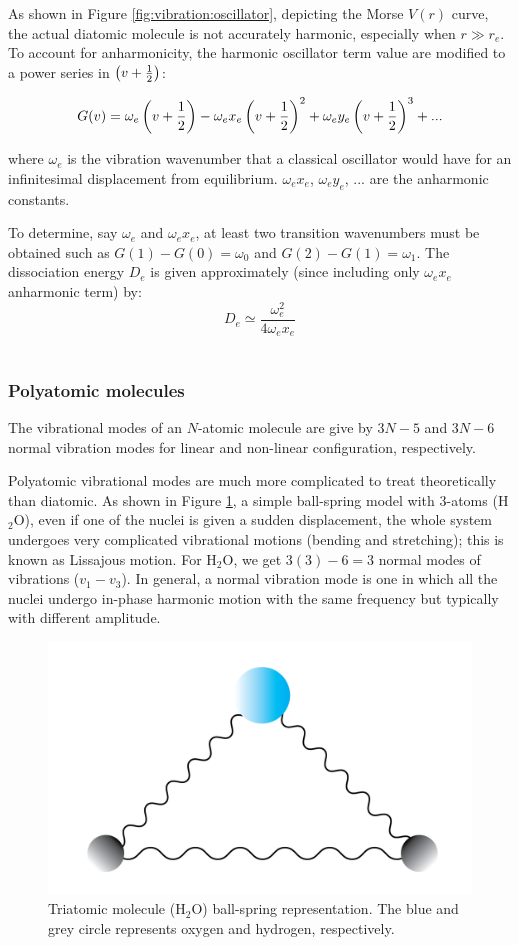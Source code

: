 As shown in Figure \ref{fig:vibration:oscillator}, depicting  the Morse $V(r)$ curve, the actual diatomic molecule is not accurately harmonic, especially when $r \gg r_e$. To account for anharmonicity, the harmonic oscillator term value are modified to a power series in $\left( v + \frac{1}{2} \right)$:

\[G(v) = \omega_e \left( v + \frac{1}{2} \right) - \omega_e x_e \left( v + \frac{1}{2} \right)^2 + \omega_e y_e \left( v + \frac{1}{2} \right)^3 + ...\]

where $\omega_e$ is the vibration wavenumber that a classical oscillator would have for an infinitesimal displacement from equilibrium. $\omega_e x_e$, $\omega_e y_e$, ... are the anharmonic constants.

To determine, say $\omega_e$ and $\omega_e x_e$, at least two transition wavenumbers must be obtained such as $G(1)-G(0)=\omega_0$ and $G(2)-G(1)=\omega_1$. The dissociation energy $D_e$ is given approximately (since including only $\omega_e x_e$ anharmonic term) by:
\[D_e \simeq \frac{\omega_e^2}{4\omega_e x_e}\]\\

\subsubsection{Polyatomic molecules}
\label{sec:mol-vibration:polyatomic}
The vibrational modes of an  $N$-atomic molecule are give by $3N-5$ and $3N-6$ normal vibration modes for linear and non-linear configuration, respectively.

Polyatomic vibrational modes are much more complicated to treat theoretically than diatomic. As shown in Figure \ref{fig:oscillator:water}, a simple ball-spring model with 3-atoms (H$_2$O), even if one of the nuclei is given a sudden displacement, the whole system undergoes very complicated vibrational motions (bending and stretching); this is known as Lissajous motion. For H$_2$O, we get $3(3)-6=3$ normal modes of vibrations ($v_1-v_3$). In general, a normal vibration mode is one in which all the nuclei undergo in-phase harmonic motion with the same frequency but typically with different amplitude.
\begin{figure}[!htb]
    \centering
    \includegraphics[scale=0.7]{figures/methods/harmonic-oscillator_polyatomic.png}
    \caption{Triatomic molecule (H$_2$O) ball-spring representation. The blue and grey circle represents oxygen and hydrogen, respectively.}
    \label{fig:oscillator:water}
\end{figure}

